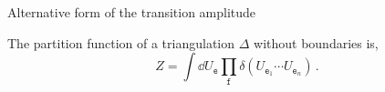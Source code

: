 \documentclass{beamer}
\begin{document}
\begin{frame}{Alternative form of the transition amplitude}
    \begin{list}{\maltese}{\leftmargin=1em \itemindent=0em}
        \item<1-> The partition function of a triangulation $\Delta$ without boundaries is,
        \begin{equation}
            Z=\int\dd{U_\mathtt{e}}\prod_\mathtt{f}\delta(U_{\mathtt{e}_1}\cdots U_{\mathtt{e}_n})\,.
        \end{equation}
        \item<2-> \noindent
        \begin{minipage}{\linewidth}
            \begin{columns}
            \end{columns}
        \end{minipage}

\end{list}
\end{frame}
\end{document}
